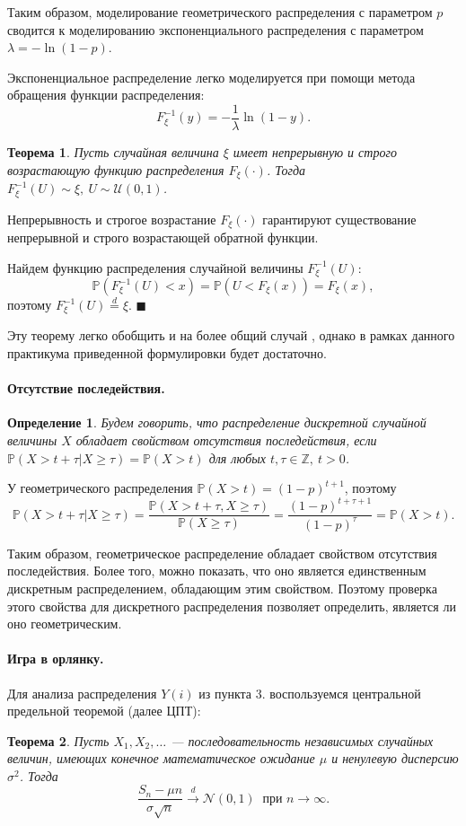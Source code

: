 \documentclass[16pt]{article}
\newtheorem{Th}{Теорема}
\newtheorem{Def}{Определение}
\newenvironment{Proof}{\par\noindent{\bf Доказательство.}}{\hfill$\scriptstyle\blacksquare$}
\newcommand\A{(\cdot)}
\newcommand{\Prb}{\mathbb{P}}
\newcommand{\deq}{\overset{d}{=}}
\begin{document}
Таким образом, моделирование геометрического распределения с параметром $p$ сводится к моделированию экспоненциального распределения с параметром $\lambda = -\ln(1 - p).$

Экспоненциальное распределение легко моделируется при помощи метода обращения функции распределения:
$$F_\xi^{-1}(y) = -\dfrac{1}{\lambda}\ln(1 - y).$$

\begin{Th}
Пусть случайная величина $\xi$ имеет непрерывную и строго возрастающую функцию распределения $F_\xi\A$. Тогда $F^{-1}_\xi(U) \sim \xi, \ U \sim \mathcal{U}(0, 1)$.
\end{Th}
\begin{Proof}

Непрерывность и строгое возрастание $F_\xi\A$ гарантируют существование непрерывной и строго возрастающей обратной функции. 

Найдем функцию распределения случайной величины $F_\xi^{-1}(U)$:
$$\Prb(F_\xi^{-1}(U) < x) = \Prb(U < F_\xi(x)) = F_\xi(x),$$
поэтому $F_\xi^{-1}(U) \deq \xi$.
\end{Proof}

Эту теорему легко обобщить и на более общий случай \cite{Smirnov}, однако в рамках данного практикума приведенной формулировки будет достаточно.

\paragraph{Отсутствие последействия.}
\begin{Def}
Будем говорить, что распределение дискретной случайной величины $X$ обладает свойством отсутствия последействия, если
$\Prb(X > t + \tau | X \geq \tau) = \Prb(X > t)$ для любых $t, \tau \in \mathbb{Z}, \ t > 0$.
\end{Def}

У геометрического распределения $\Prb(X > t) = (1 - p)^{t + 1}$, поэтому
$$\Prb(X > t + \tau | X \geq \tau) = \dfrac{\Prb(X > t + \tau, X \geq \tau)}{\Prb(X \geq \tau)} = \dfrac{(1 - p)^{t + \tau + 1}}{(1 - p)^\tau} = \Prb(X > t).$$

Таким образом, геометрическое распределение обладает свойством отсутствия последействия. Более того, можно показать, что оно является единственным дискретным распределением, обладающим этим свойством. Поэтому проверка этого свойства для дискретного распределения позволяет определить, является ли оно геометрическим.

\paragraph{Игра в орлянку.}
Для анализа распределения $Y(i)$ из пункта 3. воспользуемся центральной предельной теоремой (далее ЦПТ):
\begin{Th}
Пусть $X_1, X_2, \ldots$ --- последовательность независимых случайных величин, имеющих конечное математическое ожидание $\mu$ и ненулевую дисперсию $\sigma^2$. Тогда
$$\dfrac{S_n - \mu n}{\sigma \sqrt{n}} \overset{d}{\to} \mathcal{N}(0, 1)\ \text{ при $n \to \infty$}.$$
\end{Th}
\end{document}

